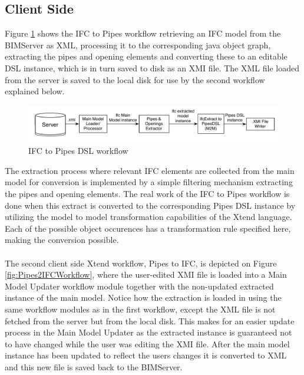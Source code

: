 \subsection{Client Side}
Figure \ref{fig:IFC2PipesWorkflow} shows the IFC to Pipes workflow retrieving an IFC model from the BIMServer as XML, processing it to the corresponding java object graph, extracting the pipes and opening elements and converting these to an editable DSL instance, which is in turn saved to disk as an XMI file. The XML file loaded from the server is saved to the local disk for use by the second workflow explained below.

\begin{figure}[htbp]
    \centering
        \includegraphics[width=120mm]{images/IFC2Pipes.pdf}
    \caption{IFC to Pipes DSL workflow}
    \label{fig:IFC2PipesWorkflow}
\end{figure}

The extraction process where relevant IFC elements are collected from the main model for conversion is implemented by a simple filtering mechanism extracting the pipes and opening elements. The real work of the IFC to Pipes workflow is done when this extract is converted to the corresponding Pipes DSL instance by utilizing the model to model transformation capabilities of the Xtend language. Each of the possible object occurences has a transformation rule specified here, making the conversion possible.
\paragraph{}
The second client side Xtend workflow, Pipes to IFC, is depicted on Figure \ref{fig:Pipes2IFCWorkflow}, where the user-edited XMI file is loaded into a Main Model Updater workflow module together with the non-updated extracted instance of the main model. Notice how the extraction is loaded in using the same workflow modules as in the first workflow, except the XML file is not fetched from the server but from the local disk. This makes for an easier update process in the Main Model Updater as the extracted instance is guaranteed not to have changed while the user was editing the XMI file. After the main model instance has been updated to reflect the users changes it is converted to XML and this new file is saved back to the BIMServer.

